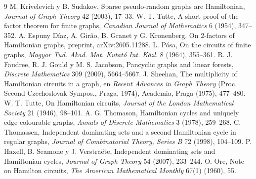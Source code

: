 \documentclass[11pt,a4paper]{article}
\theoremstyle{definition}
\theoremstyle{remark}
\begin{document}
\begin{thebibliography}{9}
 M. Krivelevich y B. Sudakov, Sparse pseudo-random graphs are Hamiltonian, \emph{Journal of Graph Theory} 42 (2003), 17--33.
 W. T. Tutte, A short proof of the factor theorem for finite graphs, \emph{Canadian Journal of Mathematics} 6 (1954), 347--352.
 A. Espuny Díaz, A. Girão, B. Granet y G. Kronenberg, On 2-factors of Hamiltonian graphs, preprint, arXiv:2605.11288.
 L. Pósa, On the circuits of finite graphs, \emph{Magyar Tud. Akad. Mat. Kutató Int. Közl.} 8 (1964), 355--361.
 R. J. Faudree, R. J. Gould y M. S. Jacobson, Pancyclic graphs and linear forests, \emph{Discrete Mathematics} 309 (2009), 5664--5667.
 J. Sheehan, The multiplicity of Hamiltonian circuits in a graph, en \emph{Recent Advances in Graph Theory} (Proc. Second Czechoslovak Sympos., Praga, 1974), Academia, Praga (1975), 477--480.
 W. T. Tutte, On Hamiltonian circuits, \emph{Journal of the London Mathematical Society} 21 (1946), 98--101.
 A. G. Thomason, Hamiltonian cycles and uniquely edge colourable graphs, \emph{Annals of Discrete Mathematics} 3 (1978), 259--268.
 C. Thomassen, Independent dominating sets and a second Hamiltonian cycle in regular graphs, \emph{Journal of Combinatorial Theory, Series B} 72 (1998), 104--109.
 P. Haxell, B. Seamone y J. Verstraëte, Independent dominating sets and Hamiltonian cycles, \emph{Journal of Graph Theory} 54 (2007), 233--244.
 O. Ore, Note on Hamilton circuits, \emph{The American Mathematical Monthly} 67(1) (1960), 55.
\end{thebibliography}
\end{document}

